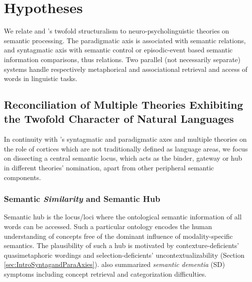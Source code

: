 \chapter{Hypotheses} %
\label{chap:hypotheses} %

We relate \citeauthor{desaussureCoursLinguistiqueGenerale1969} and \citeauthor{jakobsonFundamentalsLanguage1963}'s twofold structuralism to neuro-psycholinguistic theories on semantic processing. The paradigmatic axis is associated with semantic \similarity relations, and syntagmatic axis with semantic control or episodic-event based semantic information comparisons, thus \association relations. Two parallel (not necessarily separate) systems handle respectively metaphorical and associational retrieval and access of words in linguistic tasks.

\section{Reconciliation of Multiple Theories Exhibiting the Twofold Character of Natural Languages}

In continuity with \textcite{jakobsonFundamentalsLanguage1963}'s syntagmatic and paradigmatic axes and multiple theories on the role of cortices which are not traditionally defined as language areas, we focus on dissecting a central semantic locus, which acts as the binder, gateway or hub in different theories' nomination, apart from other peripheral semantic components. 

\subsection{Semantic \emph{Similarity} and Semantic Hub} 
\label{subsection:hypsemantichub}

Semantic hub is the locus/loci where the ontological semantic information of all words can be accessed. Such a particular ontology encodes the human understanding of concepts free of the dominant influence of modality-specific semantics. The plausibility of such a hub is motivated by contexture-deficients' quasimetaphoric wordings and selection-deficients' uncontextualizability (Section \ref{sec:IntroSyntagandParaAxies}). \textcite{pattersonWhereYouKnow2007} also summarized \emph{semantic dementia} (SD) symptoms including concept retrieval and categorization difficulties. 

